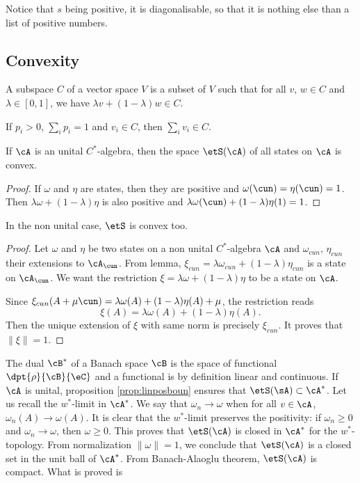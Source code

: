 Notice that $s$ being positive, it is diagonalisable, so that it is nothing else than a list of positive numbers.

\subsection{Convexity}

A  subspace $C$ of a vector space $V$ is a subset of $V$ such that for all $v$, $w\in C$ and $\lambda\in[0,1]$, we have $\lambda v+(1-\lambda)w\in C$.

If $p_i>0$, $\sum_ip_i=1$ and $v_i\in C$, then $\sum_i v_i\in C$.

\begin{lemma}
If $\cA$ is an unital $C^*$-algebra, then the space $\etS(\cA)$ of all states on $\cA$ is convex.
\end{lemma}

\begin{proof}
If $\omega$ and $\eta$ are states, then they are positive and $\omega(\cun)=\eta(\cun)=1$. Then $\lambda\omega+(1-\lambda)\eta$ is also positive and $\lambda\omega(\cun)+(1-\lambda)\eta(1)=1$.
\end{proof}

\begin{proposition}
In the non unital case, $\etS$ is convex too.
\end{proposition}

\begin{proof}
Let $\omega$ and $\eta$ be two states on a non unital $C^*$-algebra $\cA$ and $\omega_{cun}$, $\eta_{cun}$ their extensions to $\cA_{\cun}$. From lemma, $\xi_{cun}=\lambda\omega_{cun}+(1-\lambda)\eta_{cun}$ is a state on $\cA_{\cun}$. We want the restriction $\xi=\lambda\omega+(1-\lambda)\eta$ to be a state on $\cA$.

Since $\xi_{cun}(A+\mu\cun)=\lambda\omega(A)+(1-\lambda)\eta(A)+\mu$, the restriction reads
\[ 
  \xi(A)=\lambda\omega(A)+(1-\lambda)\eta(A).
\]
Then the unique extension of $\xi$ with same norm is precisely $\xi_{cun}$. It proves that $\| \xi \|=1$.
\end{proof}

The dual $\cB^*$ of a Banach space $\cB$ is the space of functional $\dpt{\rho}{\cB}{\eC}$ and a functional is by definition linear and continuous. If $\cA$ is unital, proposition \ref{prop:linposboun} ensures that $\etS(\sA)\subset\cA^*$. Let us recall the $w^*$-limit in $\cA^*$. We say that $\omega_n\to \omega$ when for all $v\in\cA$, $\omega_n(A)\to \omega(A)$. It is clear that the $w^*$-limit preserves the positivity: if $\omega_n\geq0$ and $\omega_n\to \omega$, then $\omega\geq 0$. This proves that $\etS(\cA)$ is closed in $\cA^*$ for the $w^*$-topology. From normalization $\| \omega \|=1$, we conclude  that $\etS(\cA)$ is a closed set in the unit ball of $\cA^*$. From Banach-Alaoglu theorem, $\etS(\cA)$ is compact. What is proved is

